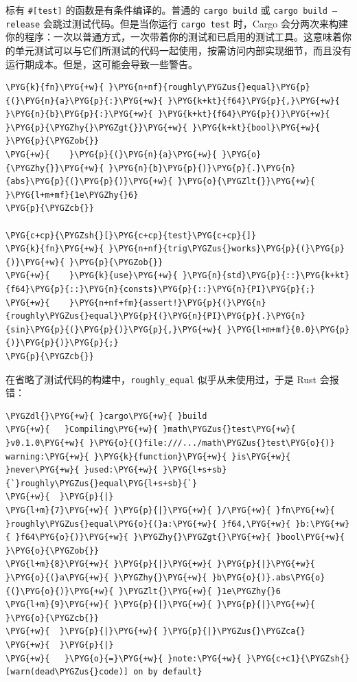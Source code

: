 标有 \texttt{\#[test]} 的函数是有条件编译的。普通的 \texttt{cargo build} 或 \texttt{cargo build --release} 会跳过测试代码。但是当你运行 \texttt{cargo test} 时，Cargo 会分两次来构建你的程序：一次以普通方式，一次带着你的测试和已启用的测试工具。这意味着你的单元测试可以与它们所测试的代码一起使用，按需访问内部实现细节，而且没有运行期成本。但是，这可能会导致一些警告。

\begin{Verbatim}[commandchars=\\\{\},breaklines=true,breakanywhere=true,fontsize=\codefont,xleftmargin=17bp]
\PYG{k}{fn}\PYG{+w}{ }\PYG{n+nf}{roughly\PYGZus{}equal}\PYG{p}{(}\PYG{n}{a}\PYG{p}{:}\PYG{+w}{ }\PYG{k+kt}{f64}\PYG{p}{,}\PYG{+w}{ }\PYG{n}{b}\PYG{p}{:}\PYG{+w}{ }\PYG{k+kt}{f64}\PYG{p}{)}\PYG{+w}{ }\PYG{p}{\PYGZhy{}\PYGZgt{}}\PYG{+w}{ }\PYG{k+kt}{bool}\PYG{+w}{ }\PYG{p}{\PYGZob{}}
\PYG{+w}{    }\PYG{p}{(}\PYG{n}{a}\PYG{+w}{ }\PYG{o}{\PYGZhy{}}\PYG{+w}{ }\PYG{n}{b}\PYG{p}{)}\PYG{p}{.}\PYG{n}{abs}\PYG{p}{(}\PYG{p}{)}\PYG{+w}{ }\PYG{o}{\PYGZlt{}}\PYG{+w}{ }\PYG{l+m+mf}{1e\PYGZhy{}6}
\PYG{p}{\PYGZcb{}}

\PYG{c+cp}{\PYGZsh{}[}\PYG{c+cp}{test}\PYG{c+cp}{]}
\PYG{k}{fn}\PYG{+w}{ }\PYG{n+nf}{trig\PYGZus{}works}\PYG{p}{(}\PYG{p}{)}\PYG{+w}{ }\PYG{p}{\PYGZob{}}
\PYG{+w}{    }\PYG{k}{use}\PYG{+w}{ }\PYG{n}{std}\PYG{p}{::}\PYG{k+kt}{f64}\PYG{p}{::}\PYG{n}{consts}\PYG{p}{::}\PYG{n}{PI}\PYG{p}{;}
\PYG{+w}{    }\PYG{n+nf+fm}{assert!}\PYG{p}{(}\PYG{n}{roughly\PYGZus{}equal}\PYG{p}{(}\PYG{n}{PI}\PYG{p}{.}\PYG{n}{sin}\PYG{p}{(}\PYG{p}{)}\PYG{p}{,}\PYG{+w}{ }\PYG{l+m+mf}{0.0}\PYG{p}{)}\PYG{p}{)}\PYG{p}{;}
\PYG{p}{\PYGZcb{}}
\end{Verbatim}

在省略了测试代码的构建中，\texttt{roughly\_equal} 似乎从未使用过，于是 Rust 会报错：

\begin{Verbatim}[commandchars=\\\{\},breaklines=true,breakanywhere=true,fontsize=\codefont,xleftmargin=17bp]
\PYGZdl{}\PYG{+w}{ }cargo\PYG{+w}{ }build
\PYG{+w}{   }Compiling\PYG{+w}{ }math\PYGZus{}test\PYG{+w}{ }v0.1.0\PYG{+w}{ }\PYG{o}{(}file:///.../math\PYGZus{}test\PYG{o}{)}
warning:\PYG{+w}{ }\PYG{k}{function}\PYG{+w}{ }is\PYG{+w}{ }never\PYG{+w}{ }used:\PYG{+w}{ }\PYG{l+s+sb}{`}roughly\PYGZus{}equal\PYG{l+s+sb}{`}
\PYG{+w}{  }\PYG{p}{|}
\PYG{l+m}{7}\PYG{+w}{ }\PYG{p}{|}\PYG{+w}{ }/\PYG{+w}{ }fn\PYG{+w}{ }roughly\PYGZus{}equal\PYG{o}{(}a:\PYG{+w}{ }f64,\PYG{+w}{ }b:\PYG{+w}{ }f64\PYG{o}{)}\PYG{+w}{ }\PYGZhy{}\PYGZgt{}\PYG{+w}{ }bool\PYG{+w}{ }\PYG{o}{\PYGZob{}}
\PYG{l+m}{8}\PYG{+w}{ }\PYG{p}{|}\PYG{+w}{ }\PYG{p}{|}\PYG{+w}{     }\PYG{o}{(}a\PYG{+w}{ }\PYGZhy{}\PYG{+w}{ }b\PYG{o}{)}.abs\PYG{o}{(}\PYG{o}{)}\PYG{+w}{ }\PYGZlt{}\PYG{+w}{ }1e\PYGZhy{}6
\PYG{l+m}{9}\PYG{+w}{ }\PYG{p}{|}\PYG{+w}{ }\PYG{p}{|}\PYG{+w}{ }\PYG{o}{\PYGZcb{}}
\PYG{+w}{  }\PYG{p}{|}\PYG{+w}{ }\PYG{p}{|}\PYGZus{}\PYGZca{}
\PYG{+w}{  }\PYG{p}{|}
\PYG{+w}{   }\PYG{o}{=}\PYG{+w}{ }note:\PYG{+w}{ }\PYG{c+c1}{\PYGZsh{}[warn(dead\PYGZus{}code)] on by default}
\end{Verbatim}

